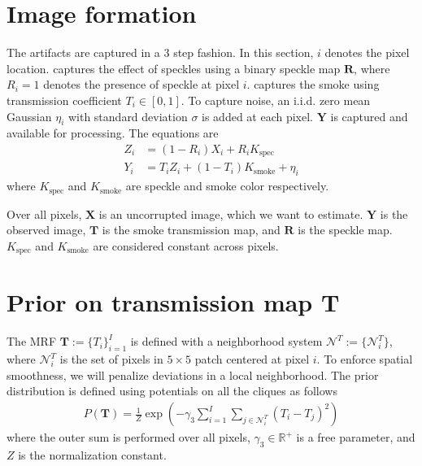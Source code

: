 \section{Image formation}
\label{sec:imgformation}
The artifacts are captured in a 3 step fashion. In this section, $i$ denotes the pixel location.  captures the effect of speckles using a binary speckle map $\mathbf{R}$, where $R_i = 1$ denotes the presence of speckle at pixel $i$.  captures the smoke using transmission coefficient $T_i \in [0, 1]$. To capture noise, an i.i.d. zero mean Gaussian $\eta_i$ with standard deviation $\sigma$ is added at each pixel. $\mathbf{Y}$ is captured and available for processing. The equations are
\begin{align}
Z_i &= (1 - R_i) X_i  + R_i K_\text{spec} \label{eqn:speckle} \\
Y_i &= T_i Z_i + (1 - T_i) K_\text{smoke} + \eta_i \label{eqn:smokenoise}
\end{align}
where $K_\text{spec}$ and $K_\text{smoke}$ are speckle and smoke color respectively.


Over all pixels, $\mathbf{X}$ is an uncorrupted image, which we want to estimate. $\mathbf{Y}$ is the observed image, $\mathbf{T}$ is the smoke transmission map, and $\mathbf{R}$ is the speckle map. $K_\text{spec}$ and $K_\text{smoke}$ are considered constant across pixels.


\section{Prior on transmission map $\mathbf{T}$}
\label{sec:modelT}
The MRF $\mathbf{T} := \lbrace T_i \rbrace_{i=1}^{I}$ is defined with a neighborhood system $\mathcal{N}^T := \lbrace \mathcal{N}_i^T \rbrace$, where $\mathcal{N}_i^T$ is the set of pixels in $5 \times 5$ patch centered at pixel $i$. To enforce spatial smoothness, we will penalize deviations in a local neighborhood. The prior distribution is defined using potentials on all the cliques as follows
\begin{align}
    P(\mathbf{T}) = \frac{1}{Z} \exp \left( - \gamma_3 \sum_{i=1}^{I} \sum_{j \in \mathcal{N}_i^T} (T_i - T_j)^2 \right) \label{eqn:spatialsmoothness}
\end{align}
where the outer sum is performed over all pixels, $\gamma_3 \in \mathbb{R}^+$ is a free parameter, and $Z$ is the normalization constant.
